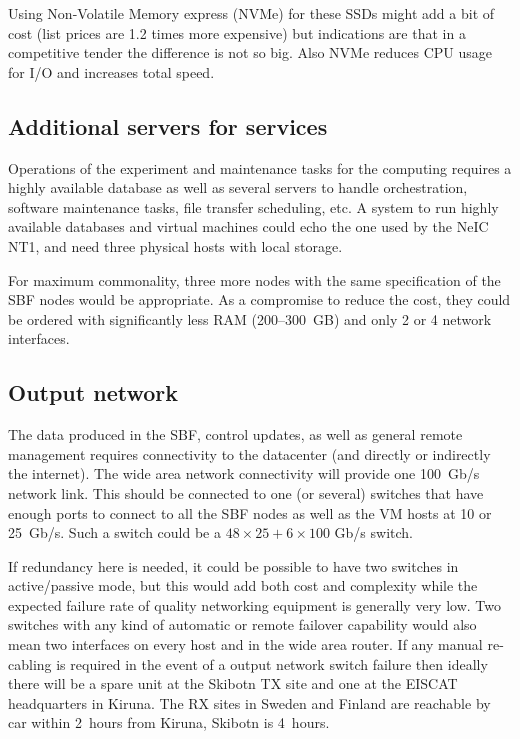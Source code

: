 \documentclass[12pt,a4paper]{article}
\begin{document}
Using Non-Volatile Memory express (NVMe) for these SSDs might add a bit of cost (list prices are 1.2 times more expensive) but indications are that in a competitive tender the difference is not so big.
Also NVMe reduces CPU usage for I/O and increases total speed.

\subsection{Additional servers for services}
Operations of the experiment and maintenance tasks for the computing requires a highly available database as well as several servers to handle orchestration, software maintenance tasks, file transfer scheduling, etc. %
A system to run highly available databases and virtual machines could echo the one used by the NeIC NT1, and need three physical hosts with local storage.

For maximum commonality, three more nodes with the same specification of the SBF nodes would be appropriate.
As a compromise to reduce the cost, they could be ordered with significantly less RAM (200--300~GB) and only 2 or 4 network interfaces.

\subsection{Output network}

The data produced in the SBF, control updates, as well as general remote management requires connectivity to the datacenter (and directly or indirectly the internet). 
The wide area network connectivity will provide one 
100~Gb/s network link.
This should be connected to one (or several) switches that have enough ports to connect to all the SBF nodes as well as the VM hosts at 10 or 25~Gb/s. 
Such a switch could be a $48 \times 25 + 6 \times 100$ Gb/s switch.

If redundancy here is needed, it could be possible to have two switches in active/passive mode, but this would add both cost and complexity while the expected failure rate of quality networking equipment is generally very low. 
Two switches with any kind of automatic or remote failover capability would also mean two interfaces on every host and in the wide area router. 
If any manual re-cabling is required in the event of a output network switch failure then ideally there will be a spare unit at the Skibotn TX site and one at the EISCAT headquarters in Kiruna.
The RX sites in Sweden and Finland are reachable by car within 2~hours from Kiruna, Skibotn is 4~hours.
\end{document}
